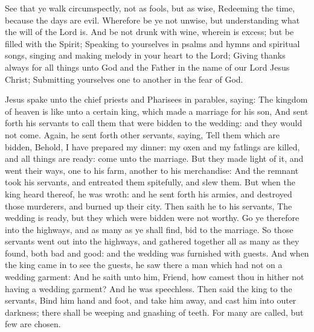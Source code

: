  See that ye walk circumspectly, not as fools, but as wise, Redeeming the time, because the days are evil. Wherefore be ye not unwise, but understanding what the will of the Lord is. And be not drunk with wine, wherein is excess; but be filled with the Spirit; Speaking to yourselves in psalms and hymns and spiritual songs, singing and making melody in your heart to the Lord; Giving thanks always for all things unto God and the Father in the name of our Lord Jesus Christ; Submitting yourselves one to another in the fear of God.


\clearpage
{}
 Jesus spake unto the chief priests and Pharisees in parables, saying: The kingdom of heaven is like unto a certain king, which made a marriage for his son, And sent forth his servants to call them that were bidden to the wedding: and they would not come. Again, he sent forth other servants, saying, Tell them which are bidden, Behold, I have prepared my dinner: my oxen and my fatlings are killed, and all things are ready: come unto the marriage. But they made light of it, and went their ways, one to his farm, another to his merchandise: And the remnant took his servants, and entreated them spitefully, and slew them. But when the king heard thereof, he was wroth: and he sent forth his armies, and destroyed those murderers, and burned up their city. Then saith he to his servants, The wedding is ready, but they which were bidden were not worthy. Go ye therefore into the highways, and as many as ye shall find, bid to the marriage. So those servants went out into the highways, and gathered together all as many as they found, both bad and good: and the wedding was furnished with guests. And when the king came in to see the guests, he saw there a man which had not on a wedding garment: And he saith unto him, Friend, how camest thou in hither not having a wedding garment? And he was speechless. Then said the king to the servants, Bind him hand and foot, and take him away, and cast him into outer darkness; there shall be weeping and gnashing of teeth. For many are called, but few are chosen.

